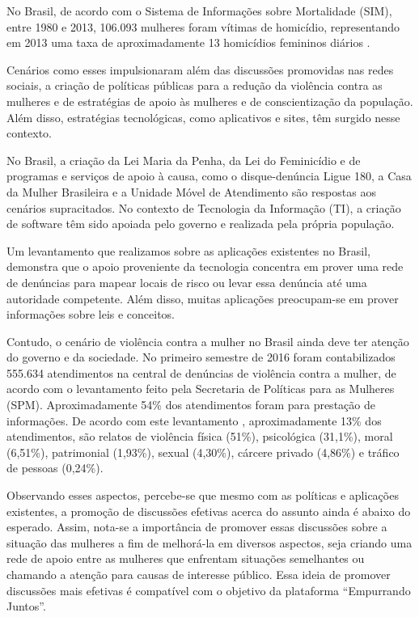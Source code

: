 No Brasil, de acordo com o Sistema de Informações sobre Mortalidade (SIM), entre 1980 e 2013, 106.093 mulheres foram vítimas de homicídio, 
representando em 2013 uma taxa de aproximadamente 13 homicídios femininos
diários \cite{mapa_violencia_2015}. 

Cenários como esses impulsionaram além das discussões promovidas nas redes sociais, a criação de políticas públicas para a redução da violência 
contra as mulheres e de estratégias de apoio às mulheres e de conscientização da população. Além disso, estratégias tecnológicas, 
como aplicativos e sites, têm surgido nesse contexto.

No Brasil, a criação da Lei Maria da Penha, da Lei do Feminicídio e de programas e serviços de apoio à causa, 
como o disque-denúncia Ligue 180, a Casa da Mulher Brasileira e a Unidade Móvel de Atendimento são respostas aos cenários supracitados. 
No contexto de Tecnologia da Informação (TI), a criação de software têm sido apoiada pelo governo e realizada pela própria população.

Um levantamento que realizamos sobre as aplicações existentes no Brasil, demonstra que o apoio proveniente da tecnologia concentra em 
prover uma rede de denúncias para mapear locais de risco ou levar essa denúncia até uma autoridade competente. Além disso, muitas aplicações 
preocupam-se em prover informações sobre leis e conceitos.

Contudo, o cenário de violência contra a mulher no Brasil ainda deve ter atenção do governo e da sociedade. No primeiro semestre de 2016 
foram contabilizados 555.634 atendimentos na central de denúncias 
de violência contra a mulher, de acordo com o levantamento feito pela Secretaria de Políticas para as Mulheres (SPM). 
Aproximadamente 54\% dos atendimentos foram para prestação de informações. De acordo com este levantamento \cite{portal_180}, aproximadamente 13\% dos 
atendimentos, 
são relatos de violência física (51\%), psicológica (31,1\%), moral (6,51\%), patrimonial (1,93\%), sexual (4,30\%), cárcere privado (4,86\%) e 
tráfico de pessoas (0,24\%).

Observando esses aspectos, percebe-se que mesmo com as políticas e aplicações existentes, a promoção de discussões efetivas acerca do 
assunto ainda é abaixo do esperado. Assim, nota-se a importância de promover essas discussões sobre a situação das mulheres a fim de 
melhorá-la em diversos aspectos, seja criando uma rede de apoio entre as mulheres que enfrentam situações semelhantes ou chamando a atenção 
para causas de interesse público. Essa ideia de promover discussões mais efetivas é compatível com o objetivo da plataforma ``Empurrando Juntos''.

